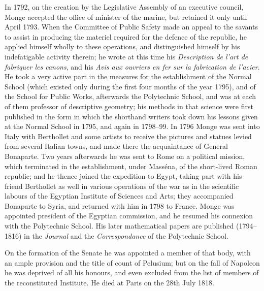 \documentclass[11pt,a4paper]{book}
\begin{document}
In 1792, on the creation by the Legislative Assembly of an executive council, Monge accepted the office of minister of the marine, but retained it only until April 1793. When the Committee of Public Safety made an appeal to the savants to assist in producing the materiel required for the defence of the republic, he applied himself wholly to these operations, and distinguished himself by his indefatigable activity therein; he wrote at this time his \textit{Description de l'art de fabriquer les canons}, and his \textit{Avis aux ouvriers en fer sur la fabrication de l'acier}. He took a very active part in the measures for the establishment of the Normal School (which existed only during the first four months of the year 1795), and of the School for Public Works, afterwards the Polytechnic School, and was at each of them professor of descriptive geometry; his methods in that science were first published in the form in which the shorthand writers took down his lessons given at the Normal School in 1795, and again in 1798--99. In 1796 Monge was sent into Italy with Berthollet and some artists to receive the pictures and statues levied from several Italian towns, and made there the acquaintance of General Bonaparte. Two years afterwards he was sent to Rome on a political mission, which terminated in the establishment, under Mass\'ena, of the short-lived Roman republic; and he thence joined the expedition to Egypt, taking part with his friend Berthollet as well in various operations of the war as in the scientific labours of the Egyptian Institute of Sciences and Arts; they accompanied Bonaparte to Syria, and returned with him in 1798 to France. Monge was appointed president of the Egyptian commission, and he resumed his connexion with the Polytechnic School. His later mathematical papers are published (1794--1816) in the \textit{Journal} and the \textit{Correspondance} of the Polytechnic School.

On the formation of the Senate he was appointed a member of that body, with an ample provision and the title of count of Pelusium; but on the fall of Napoleon he was deprived of all his honours, and even excluded from the list of members of the reconstituted Institute. He died at Paris on the 28th July 1818.
\end{document}
